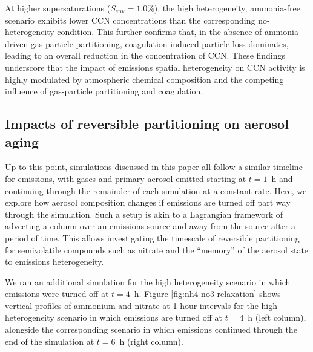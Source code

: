 \documentclass[acp, manuscript]{copernicus}
\begin{document}
At higher supersaturations ($S_{\mathrm{env}}=1.0\%$), the high heterogeneity, ammonia-free scenario exhibits lower CCN
concentrations than the corresponding no-heterogeneity condition. This further confirms that, 
in the absence of
ammonia-driven gas-particle partitioning, coagulation-induced particle
loss dominates, leading to an overall reduction in the concentration of 
CCN. These findings underscore that the impact of emissions spatial heterogeneity on CCN activity is highly modulated by atmospheric chemical composition and the competing influence of gas-particle partitioning and coagulation.


\subsection{Impacts of reversible partitioning on aerosol aging}\label{sec:reversible-aging}
Up to this point, simulations discussed in this paper all follow a similar timeline for emissions, with gases and primary aerosol emitted starting at $t=1$~h and continuing through the remainder of each simulation at a constant rate. Here, we explore how aerosol composition changes if emissions are turned off part way through the simulation. Such a setup is akin to a Lagrangian framework of advecting a column over an emissions source and away from the source after a period of time. This allows investigating the timescale of reversible partitioning for semivolatile compounds such as nitrate and the ``memory'' of the aerosol state to emissions heterogeneity. 

We ran an additional simulation for the high heterogeneity scenario in which emissions were turned off at $t=4$~h. Figure \ref{fig:nh4-no3-relaxation} shows vertical profiles of ammonium and nitrate at 1-hour intervals for the high heterogeneity scenario in which emissions are turned off at $t=4$~h (left column), alongside the corresponding scenario in which  emissions continued through the end of the simulation at $t=6$~h (right column).
\end{document}
